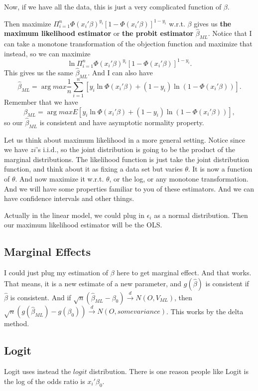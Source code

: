 \documentclass[11pt,a4paper]{amsart}
\theoremstyle{plain}
\theoremstyle{definition}
\begin{document}
	Now, if we have all the data, this is just a very complicated function of $\beta$.\par
	Then maximize $ \Pi_{i=1}^{n} \Phi(x_{i}'\beta)^{y_{i}} [1- \Phi(x_{i}'\beta)]^{1-y_{i}}$ w.r.t. $\beta$ gives us \textbf{the maximum likelihood estimator} or \textbf{the probit estimator} $\hat{\beta}_{ML}$. Notice that I can take a monotone transformation of the objection function and maximize that instead, so we can maximize 
	\[	\ln \Pi_{i=1}^{n} \Phi(x_{i}'\beta)^{y_{i}} [1- \Phi(x_{i}'\beta)]^{1-y_{i}}.	\]
	This gives us the same $\hat{\beta}_{ML}$. And I can also have 
	\[	\hat{\beta}_{ML} = \arg max \frac{1}{n} \sum_{i=1}^{n}[y_{i}\ln \Phi(x_{i}'\beta) + (1-y_{i})\ln(1-\Phi(x_{i}'\beta))].	\]
	Remember that we have 
	\[	\beta_{ML} = \arg max E[y_{i}\ln \Phi(x_{i}'\beta) + (1-y_{i})\ln(1-\Phi(x_{i}'\beta))],	\]
	so our $\hat{\beta}_{ML} $ is consistent and have asymptotic normality property.\par 
	Let us think about maximum likelihood in a more general setting. Notice since we have $z{i}$'s i.i.d., so the joint distribution is going to be the product of the marginal distributions. The likelihood function is just take the joint distribution function, and think about it as fixing a data set but varies $\theta$. It is now a function of $\theta$. And now maximize it w.r.t. $\theta$, or the log, or any monotone transformation. And we will have some properties familiar to you of these estimators. And we can have confidence intervals and other things.\par 
	Actually in the linear model, we could plug in $\epsilon_{i}$ as a normal distribution. Then our maximum likelihood estimator will be the OLS.
\subsection{Marginal Effects}
	I could just plug my estimation of $\beta$ here to get marginal effect. And that works. That means, it is a new estimate of a new parameter, and $g(\hat{\beta})$ is consistent if $\hat{\beta}$ is consistent. And if $\sqrt{n}(\hat{\beta}_{ML} - \beta_{0}) \stackrel{d}{\rightarrow} N(O,V_{ML})$, then $\sqrt{n}(g(\hat{\beta}_{ML}) - g(\beta_{0})) \stackrel{d}{\rightarrow} N(O,some variance)$. This works by the delta method.
\subsection{Logit}
	Logit uses instead the $logit$ distribution. There is one reason people like Logit is the log of the odds ratio is $x_{i}'\beta_{0}$. 
\end{document}

